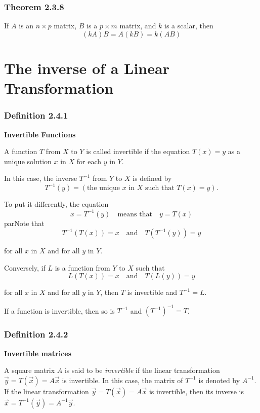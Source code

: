\documentclass{report}
\begin{document}
\subsubsection*{Theorem 2.3.8}
\par\noindent If $A$ is an $n\times{}p$ matrix, $B$ is a $p\times{}m$ matrix, and $k$ is a scalar, then
\[(kA)B=A(kB)=k(AB)\]
\pagebreak

\section{The inverse of a Linear Transformation}
\subsubsection*{Definition 2.4.1}
\par\noindent\textbf{Invertible Functions}
\par\noindent A function $T$ from $X$ to $Y$ is called invertible if the equation $T(x)=y$ as a unique solution $x$ in $X$ for each $y$ in $Y$.
\par\noindent In this case, the inverse $T^{-1}$ from $Y$ to $X$ is defined by
\[T^{-1}(y)=\left(\textrm{the unique }x\textrm{ in }X\textrm{ such that }T(x)=y\right).\]
\par\noindent To put it differently, the equation
\[x=T^{-1}(y)\quad\textrm{means that}\quad y=T(x)\]
par\noindent Note that
\[T^{-1}(T(x))=x\quad\textrm{and}\quad T(T^{-1}(y))=y\]
\par\noindent for all $x$ in $X$ and for all $y$ in $Y$.
\par\noindent Conversely, if $L$ is a function from $Y$ to $X$ such that
\[L(T(x))=x\quad\textrm{and}\quad T(L(y))=y\]
\par\noindent for all $x$ in $X$ and for all $y$ in $Y$, then $T$ is invertible and $T^{-1}=L$.
\par\noindent If a function is invertible, then so is $T^{-1}$ and $(T^{-1})^{-1}=T$.
\subsubsection*{Definition 2.4.2}
\par\noindent\textbf{Invertible matrices}
\par\noindent A square matrix $A$ is said to be \textit{invertible} if the linear transformation $\vec{y}=T(\vec{x})=A\vec{x}$ is invertible. In this case, the matrix of $T^{-1}$ is denoted by $A^{-1}$. If the linear transformation $\vec{y}=T(\vec{x})=A\vec{x}$ is invertible, then its inverse is $\vec{x}=T^{-1}(\vec{y})=A^{-1}\vec{y}$.
\end{document}
